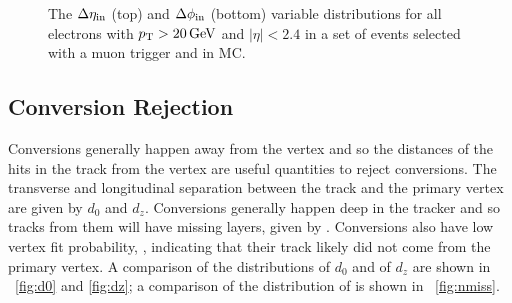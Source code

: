\begin{figure}[!htbp]
\begin{subfigure}[b]{\StackedPlotWidth}
        \caption{}
        \label{fig:dphi}
    \end{subfigure}
    \caption[
        Distributions of $\detain$ and $\dphiin$ in data and MC.
    ]{
        The $\detain$ (top) and $\dphiin$ (bottom) variable distributions for
        all electrons with $p_{\mathrm{T}} > 20 \,\text{Ge\hspace{-.08em}V}$ and $|\eta| < 2.4$ in a set of
        events selected with a muon trigger and in \MADGRAPH \Ztoee MC.
    }
    \label{fig:dtrack}
\end{figure}

\subsection{Conversion Rejection}

Conversions generally happen away from the vertex and so the distances of the
hits in the track from the vertex are useful quantities to reject conversions.
The transverse and longitudinal separation between the track and the primary
vertex are given by $d_{0}$ and $d_{z}$. Conversions generally happen deep in
the tracker and so tracks from them will have missing layers, given by \nmiss.
Conversions also have low vertex fit probability, \pvtx, indicating that their
track likely did not come from the primary vertex. A comparison of the
distributions of $d_{0}$ and of $d_{z}$ are shown in \FIGS~\ref{fig:d0} and
\ref{fig:dz}; a comparison of the distribution of \nmiss is shown in
\FIG~\ref{fig:nmiss}.

